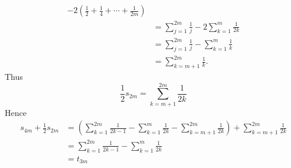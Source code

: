 \documentclass[12pt]{article}
\begin{document}
\begin{enumerate}
\[\begin{aligned}
                  -2\left(\frac12+\frac14+\cdots+\frac1{2m}\right)             \\
                   & =\sum_{j=1}^{2m}\frac1j
                  -2\sum_{k=1}^{m}\frac1{2k}                                   \\
                   & =\sum_{j=1}^{2m}\frac1j
                  -\sum_{k=1}^{m}\frac1k                                       \\
                   & =\sum_{k=m+1}^{2m}\frac1k.
              \end{aligned}
          \]
          Thus
          \[
              \frac{1}{2}s_{2m} = \sum_{k=m+1}^{2m}\frac{1}{2k}
          \]
          Hence
          \[
              \begin{aligned}
                  s_{4m}+\frac12s_{2m}
                   & =
                  \left(
                  \sum_{k=1}^{2m}\frac{1}{2k-1}
                  -
                  \sum_{k=1}^{m}\frac{1}{2k}
                  -
                  \sum_{k=m+1}^{2m}\frac{1}{2k}
                  \right)
                  +
                  \sum_{k=m+1}^{2m}\frac{1}{2k} \\
                   & =
                  \sum_{k=1}^{2m}\frac{1}{2k-1}
                  -
                  \sum_{k=1}^{m}\frac{1}{2k}    \\
                   & = t_{3m}
              \end{aligned}
          \]


\end{enumerate}
\end{document}
